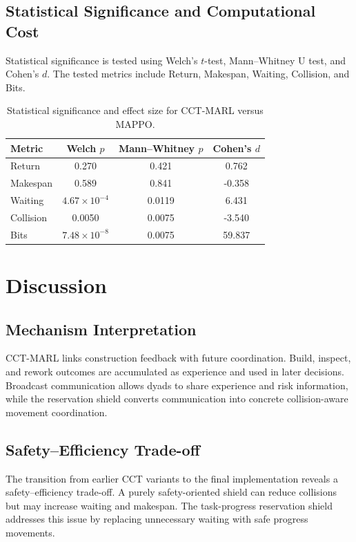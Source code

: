 \documentclass[fleqn,10pt]{wlpeerj}
\begin{document}
\subsection{Statistical Significance and Computational Cost}
Statistical significance is tested using Welch's $t$-test, Mann--Whitney U test, and Cohen's $d$. The tested metrics include Return, Makespan, Waiting, Collision, and Bits.

\begin{table}[htbp]
\centering
\caption{Statistical significance and effect size for CCT-MARL versus MAPPO.}
\label{tab:stats}
\begin{tabular}{lccc}
\toprule
Metric & Welch $p$ & Mann--Whitney $p$ & Cohen's $d$ \\
\midrule
Return & 0.270 & 0.421 & 0.762 \\
Makespan & 0.589 & 0.841 & -0.358 \\
Waiting & $4.67\times10^{-4}$ & 0.0119 & 6.431 \\
Collision & 0.0050 & 0.0075 & -3.540 \\
Bits & $7.48\times10^{-8}$ & 0.0075 & 59.837 \\
\bottomrule
\end{tabular}
\end{table}

\section{Discussion}

\subsection{Mechanism Interpretation}

CCT-MARL links construction feedback with future coordination. Build, inspect, and rework outcomes are accumulated as experience and used in later decisions. Broadcast communication allows dyads to share experience and risk information, while the reservation shield converts communication into concrete collision-aware movement coordination.

\subsection{Safety--Efficiency Trade-off}

The transition from earlier CCT variants to the final implementation reveals a safety--efficiency trade-off. A purely safety-oriented shield can reduce collisions but may increase waiting and makespan. The task-progress reservation shield addresses this issue by replacing unnecessary waiting with safe progress movements.
\end{document}
